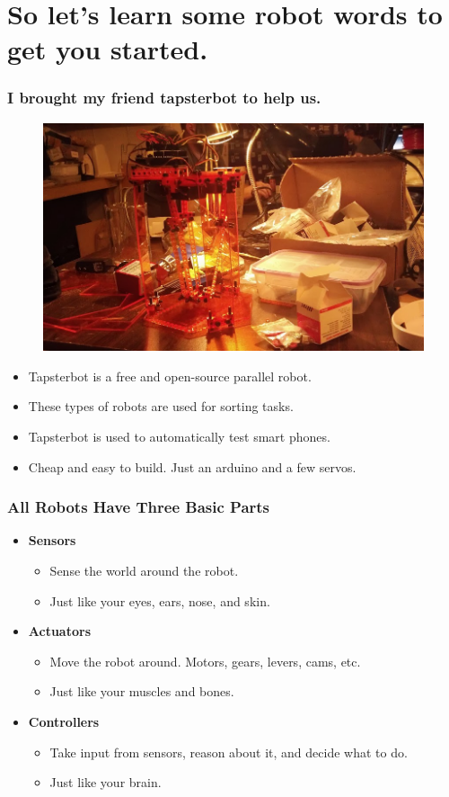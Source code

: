 \documentclass[compress]{beamer}
\begin{document}
\section{So let's learn some robot words to get you started.}
\begin{frame}
   \frametitle{I brought my friend tapsterbot to help us.}
   \begin{figure}
     \includegraphics[width=0.7\linewidth]{tapster.jpg}
   \end{figure}

   \begin{itemize}
   \item Tapsterbot is a free and open-source parallel robot. 
   \item These types of robots are used for sorting tasks.
   \item Tapsterbot is used to automatically test smart phones.
   \item Cheap and easy to build. Just an arduino and a few servos.
   \end{itemize}
 \end{frame}
\begin{frame}
   \frametitle{All Robots Have Three Basic Parts}
   \begin{itemize}
   \item \textbf{Sensors}
     \begin{itemize}
       \item Sense the world around the robot.
       \item Just like your eyes, ears, nose, and skin.
     \end{itemize}
   \item \textbf{Actuators}
     \begin{itemize}
       \item Move the robot around. Motors, gears, levers, cams, etc.
       \item Just like your muscles and bones.
     \end{itemize}     
   \item \textbf{Controllers} 
     \begin{itemize}
       \item Take input from sensors, reason about it, and decide what to do.
       \item Just like your brain. 
     \end{itemize}          
   \end{itemize}     
 \end{frame}
\end{document}
